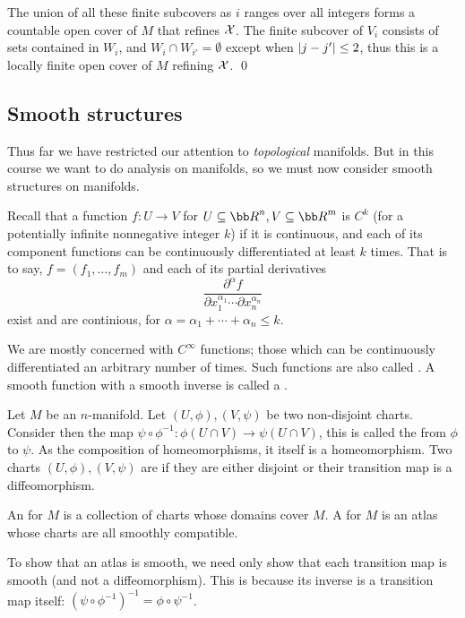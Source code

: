     The union of all these finite subcovers as $i$ ranges over all integers forms a countable open cover of $M$ that refines ${\cal X}$.
    The finite subcover of $V_i$ consists of sets contained in $W_i$, and $W_i\cap W_{i'}=\emptyset$ except when $\mathopen{}\mathclose{\left|j-j'\right|}\leq2$, thus this is a locally finite open cover
    of $M$ refining ${\cal X}$.
    \qed

\eproof

\subsection{Smooth structures}

Thus far we have restricted our attention to {\it topological\/} manifolds.
But in this course we want to do analysis on manifolds, so we must now consider smooth structures on manifolds.

Recall that a function $f\colon U\to V$ for $U\subseteq\bR^n,V\subseteq\bR^m$ is $C^k$ (for a potentially infinite nonnegative integer $k$) if it is continuous,
and each of its component functions can be continuously differentiated at least $k$ times.
That is to say, $f=(f_1,\dots,f_m)$ and each of its partial derivatives
$$ \frac{\partial^\alpha f}{\partial x_1^{\alpha_1}\cdots\partial x_n^{\alpha_n}} $$
exist and are continious, for $\alpha=\alpha_1+\cdots+\alpha_n\leq k$.

We are mostly concerned with $C^\infty$ functions; those which can be continuously differentiated an arbitrary number of times.
Such functions are also called .
A smooth function with a smooth inverse is called a .

\bdefn

    Let $M$ be an $n$-manifold.
    Let $(U,\phi),(V,\psi)$ be two non-disjoint charts.
    Consider then the map $\psi\circ\phi^{-1}\colon\phi(U\cap V)\to\psi(U\cap V)$, this is called the  from $\phi$ to $\psi$.
    As the composition of homeomorphisms, it itself is a homeomorphism.
    Two charts $(U,\phi),(V,\psi)$ are  if they are either disjoint or their transition map is a diffeomorphism.

    An  for $M$ is a collection of charts whose domains cover $M$.
    A  for $M$ is an atlas whose charts are all smoothly compatible.

\edefn

To show that an atlas is smooth, we need only show that each transition map is smooth (and not a diffeomorphism).
This is because its inverse is a transition map itself: $(\psi\circ\phi^{-1})^{-1}=\phi\circ\psi^{-1}$.

